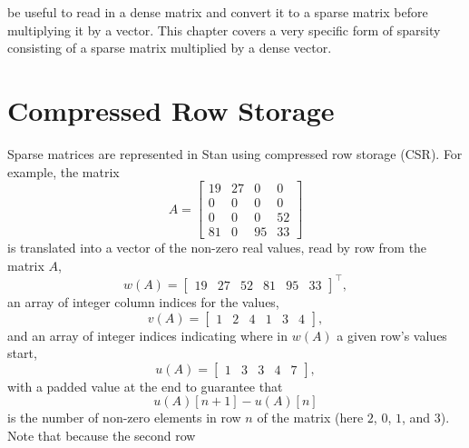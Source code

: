 \begin{description}
\begin{description}
\begin{description}
\begin{description}
\begin{description}
\begin{description}
\begin{description}
\begin{description}
\begin{description}
\begin{description}
\begin{description}
\begin{description}
\begin{description}
\begin{description}
\begin{description}
\begin{description}
\begin{description}
\begin{description}
\begin{description}
\begin{description}
\begin{description}
\begin{description}
\begin{description}
\begin{description}
\begin{description}
\begin{description}
\begin{description}
\begin{description}
\begin{description}
\begin{description}
\begin{description}
\begin{description}
\begin{description}
\begin{description}
\begin{description}
\begin{description}
\begin{description}
\begin{description}
\begin{description}
\begin{description}
\begin{description}
\begin{description}
\begin{description}
\begin{description}
\begin{description}
\begin{description}
\begin{description}
\begin{description}
\begin{description}
\begin{description}
\begin{description}
\begin{description}
\begin{description}
\begin{description}
\begin{description}
\begin{description}
\begin{description}
\begin{description}
\begin{description}
\begin{description}
\begin{description}
\begin{description}
\begin{description}
\begin{description}
\begin{description}
\begin{description}
\begin{description}
\begin{description}
\begin{description}
\begin{description}
\begin{description}
\begin{description}
\begin{description}
\begin{description}
be useful to read in a dense matrix and convert it to a sparse matrix before multiplying it by a vector.  This chapter covers a very specific form of sparsity consisting of a sparse matrix multiplied by a dense vector.

\section{Compressed Row Storage}

Sparse matrices are represented in Stan using compressed row storage (CSR).  For example, the matrix \[ A = \begin{bmatrix} 19 & 27 & 0 & 0 \\ 0 & 0 & 0 & 0 \\ 0 & 0 & 0 & 52 \\ 81 & 0 & 95 & 33 \end{bmatrix} \] is translated into a vector of the non-zero real values, read by row from the matrix $A$, \[ w(A) = \begin{bmatrix} 19 & 27 & 52 & 81 & 95 & 33 \end{bmatrix}^{\top} \! \! \! , \] an array of integer column indices for the values, \[ v(A) = \begin{bmatrix} 1 & 2 & 4 & 1 & 3 & 4 \end{bmatrix} \! , \] and an array of integer indices indicating where in $w(A)$ a given row's values start, \[ u(A) = \begin{bmatrix} 1 & 3 & 3 & 4 & 7 \end{bmatrix} \! , \] with a padded value at the end to guarantee that \[ u(A)[n+1] - u(A)[n] \] is the number of non-zero elements in row $n$ of the matrix (here $2$, $0$, $1$, and $3$). Note that because the second row 
\end{description}
\end{description}
\end{description}
\end{description}
\end{description}
\end{description}
\end{description}
\end{description}
\end{description}
\end{description}
\end{description}
\end{description}
\end{description}
\end{description}
\end{description}
\end{description}
\end{description}
\end{description}
\end{description}
\end{description}
\end{description}
\end{description}
\end{description}
\end{description}
\end{description}
\end{description}
\end{description}
\end{description}
\end{description}
\end{description}
\end{description}
\end{description}
\end{description}
\end{description}
\end{description}
\end{description}
\end{description}
\end{description}
\end{description}
\end{description}
\end{description}
\end{description}
\end{description}
\end{description}
\end{description}
\end{description}
\end{description}
\end{description}
\end{description}
\end{description}
\end{description}
\end{description}
\end{description}
\end{description}
\end{description}
\end{description}
\end{description}
\end{description}
\end{description}
\end{description}
\end{description}
\end{description}
\end{description}
\end{description}
\end{description}
\end{description}
\end{description}
\end{description}
\end{description}
\end{description}
\end{description}
\end{description}
\end{description}
\end{description}

